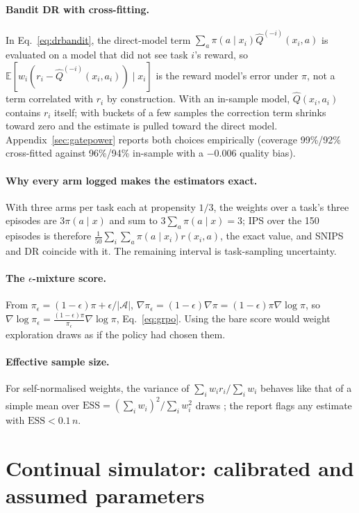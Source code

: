 \documentclass[10pt]{article}
\newcommand{\E}{\mathbb{E}}
\begin{document}
\paragraph{Bandit DR with cross-fitting.} In Eq.~\eqref{eq:drbandit}, the direct-model term $\sum_a\pi(a\mid x_i)\hat Q^{(-i)}(x_i,a)$ is evaluated on a model that did not see task $i$'s reward, so $\E[w_i(r_i-\hat Q^{(-i)}(x_i,a_i))\mid x_i]$ is the reward model's error under $\pi$, not a term correlated with $r_i$ by construction. With an in-sample model, $\hat Q(x_i,a_i)$ contains $r_i$ itself; with buckets of a few samples the correction term shrinks toward zero and the estimate is pulled toward the direct model. Appendix~\ref{sec:gatepower} reports both choices empirically (coverage 99\%/92\% cross-fitted against 96\%/94\% in-sample with a $-0.006$ quality bias).

\paragraph{Why every arm logged makes the estimators exact.} With three arms per task each at propensity $1/3$, the weights over a task's three episodes are $3\pi(a\mid x)$ and sum to $3\sum_a\pi(a\mid x)=3$; IPS over the 150 episodes is therefore $\frac{1}{50}\sum_i\sum_a\pi(a\mid x_i)r(x_i,a)$, the exact value, and SNIPS and DR coincide with it. The remaining interval is task-sampling uncertainty.

\paragraph{The $\epsilon$-mixture score.} From $\pi_\epsilon=(1-\epsilon)\pi+\epsilon/|\mathcal{A}|$, $\nabla\pi_\epsilon=(1-\epsilon)\nabla\pi=(1-\epsilon)\pi\nabla\log\pi$, so $\nabla\log\pi_\epsilon=\frac{(1-\epsilon)\pi}{\pi_\epsilon}\nabla\log\pi$, Eq.~\eqref{eq:grpo}. Using the bare score would weight exploration draws as if the policy had chosen them.

\paragraph{Effective sample size.} For self-normalised weights, the variance of $\sum_i w_ir_i/\sum_iw_i$ behaves like that of a simple mean over $\mathrm{ESS}=(\sum_iw_i)^2/\sum_iw_i^2$ draws \citep{kish1965survey}; the report flags any estimate with $\mathrm{ESS}<0.1\,n$.

\section{Continual simulator: calibrated and assumed parameters}
\label{app:sim}
\end{document}

